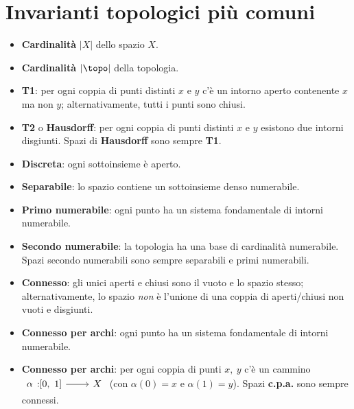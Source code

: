 \section{Invarianti topologici più comuni}
\begin{multicols}{2}
	\textls{\textsc{\textcolor{reddo}{Cardinalità}}}
	\begin{itemize}
		\item \textbf{Cardinalità} $\vert X\vert$ dello spazio $X$.
		\item \textbf{Cardinalità} $\vert \topo\vert$ della topologia.
	\end{itemize}
\textls{\textsc{\textcolor{reddo}{Assiomi di separazione}}}
\begin{itemize}
	\item \textbf{T1}: per ogni coppia di punti distinti $x$ e $y$ c'è un intorno aperto contenente $x$ ma non $y$; alternativamente, tutti i punti sono chiusi.
	\item \textbf{T2} o \textbf{Hausdorff}: per ogni coppia di punti distinti $x$ e $y$ esistono due intorni disgiunti. Spazi di \textbf{Hausdorff} sono sempre \textbf{T1}.
	\item \textbf{Discreta}: ogni sottoinsieme è aperto.
\end{itemize}
\textls{\textsc{\textcolor{reddo}{Assiomi di numerabilità}}}
\begin{itemize}
	\item \textbf{Separabile}: lo spazio contiene un sottoinsieme denso numerabile.
	\item \textbf{Primo numerabile}: ogni punto ha un sistema fondamentale di intorni numerabile.
	\item \textbf{Secondo numerabile}: la topologia ha una base di cardinalità numerabile. Spazi secondo numerabili sono sempre separabili e primi numerabili.
\end{itemize}
\textls{\textsc{\textcolor{reddo}{Connessione}}}
\begin{itemize}
	\item \textbf{Connesso}: gli unici aperti e chiusi sono il vuoto e lo spazio stesso; alternativamente, lo spazio \textit{non} è l'unione di una coppia di aperti/chiusi non vuoti e disgiunti.
	\item \textbf{Connesso per archi}: ogni punto ha un sistema fondamentale di intorni numerabile.
	\item \textbf{Connesso per archi}: per ogni coppia di punti $x,\ y$ c'è un cammino $\funz{\alpha}{\left[0,\ 1\right]}{X}$ (con $\alpha\left(0\right)=x$ e $\alpha\left(1\right)=y$). Spazi \textbf{c.p.a.} sono sempre connessi.

\end{itemize}
\end{multicols}
